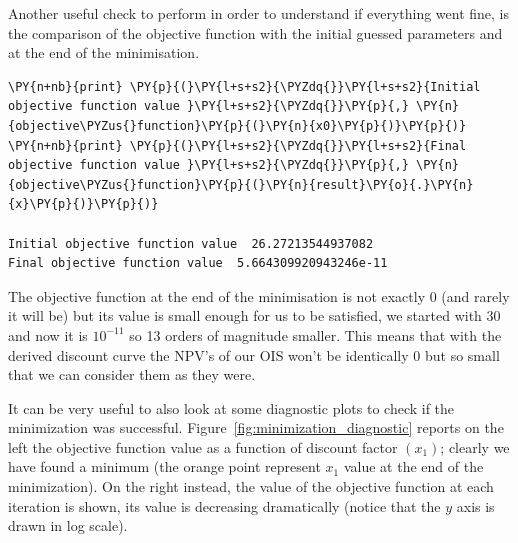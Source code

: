 Another useful check to perform in order to understand if everything went fine, is the comparison of the objective function with the initial guessed parameters and at the end of the minimisation.

\begin{tcolorbox}[breakable, size=fbox, boxrule=1pt, pad at break*=1mm,colback=cellbackground, colframe=cellborder]
\begin{Verbatim}[commandchars=\\\{\}]
\PY{n+nb}{print} \PY{p}{(}\PY{l+s+s2}{\PYZdq{}}\PY{l+s+s2}{Initial objective function value }\PY{l+s+s2}{\PYZdq{}}\PY{p}{,} \PY{n}{objective\PYZus{}function}\PY{p}{(}\PY{n}{x0}\PY{p}{)}\PY{p}{)}
\PY{n+nb}{print} \PY{p}{(}\PY{l+s+s2}{\PYZdq{}}\PY{l+s+s2}{Final objective function value }\PY{l+s+s2}{\PYZdq{}}\PY{p}{,} \PY{n}{objective\PYZus{}function}\PY{p}{(}\PY{n}{result}\PY{o}{.}\PY{n}{x}\PY{p}{)}\PY{p}{)}
	
Initial objective function value  26.27213544937082
Final objective function value  5.664309920943246e-11
\end{Verbatim}
\end{tcolorbox}
The objective function at the end of the minimisation is not exactly 0 (and rarely it will be) but its value is small enough for us to be satisfied, we started with $30$ and now it is $10^{-11}$ so 13 orders of magnitude smaller. This means that with the derived discount curve the NPV's of our OIS won't be identically 0 but so small that we can consider them as they were.

It can be very useful to also look at some diagnostic plots to check if the minimization was successful. Figure~\ref{fig:minimization_diagnostic} reports on the left the objective function value as a function of discount factor $(x_1)$; clearly we have found a minimum (the orange point represent $x_1$ value at the end of the minimization). On the right instead, the value of the objective function at each iteration is shown, its value is decreasing dramatically (notice that the $y$ axis is drawn in log scale).

